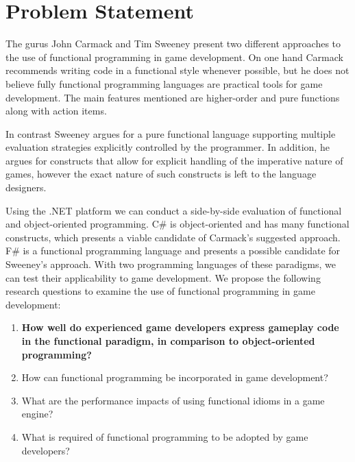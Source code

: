 \section{Problem Statement} \label{sec:problem_statement}
The gurus John Carmack and Tim Sweeney present two different approaches to the use of functional programming in game development. On one hand Carmack recommends writing code in a functional style whenever possible, but he does not believe fully functional programming languages are practical tools for game development. The main features mentioned are higher-order and pure functions along with action items.

In contrast Sweeney argues for a pure functional language supporting multiple evaluation strategies explicitly controlled by the programmer. In addition, he argues for constructs that allow for explicit handling of the imperative nature of games, however the exact nature of such constructs is left to the language designers.

Using the .NET platform we can conduct a side-by-side evaluation of functional and object-oriented programming. C\# is object-oriented and has many functional constructs, which presents a viable candidate of Carmack's suggested approach. F\# is a functional programming language and presents a possible candidate for Sweeney's approach. With two programming languages of these paradigms, we can test their applicability to game development. We propose the following research questions to examine the use of functional programming in game development:

\begin{center}
    \begin{enumerate}
        \item \textbf{How well do experienced game developers express gameplay code in the functional paradigm, in comparison to object-oriented programming?}
        \item How can functional programming be incorporated in game development?
        \item What are the performance impacts of using functional idioms in a game engine?
        \item What is required of functional programming to be adopted by game developers?
    \end{enumerate}
\end{center}